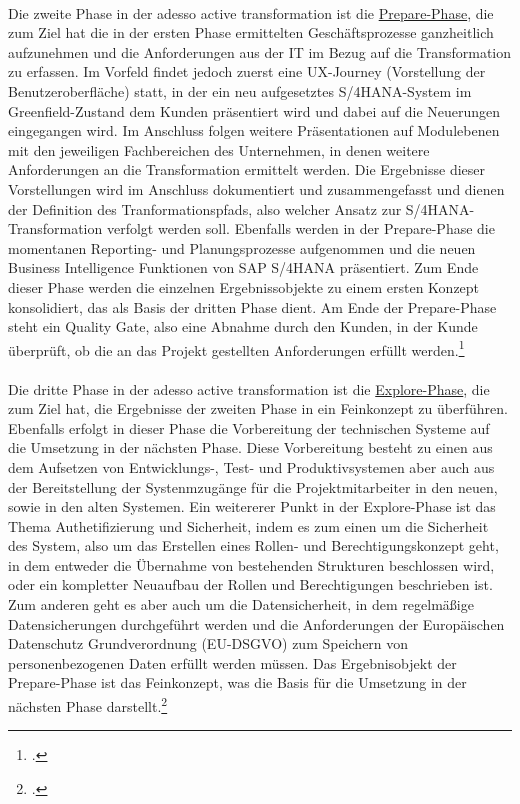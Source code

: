 \\Die zweite Phase in der adesso active transformation ist die \underline{\glqq{}Prepare\grqq{}-Phase}, die zum Ziel hat die in der ersten Phase ermittelten Geschäftsprozesse ganzheitlich aufzunehmen und die Anforderungen aus der IT im Bezug auf die Transformation zu erfassen. Im Vorfeld findet jedoch zuerst eine UX-Journey (Vorstellung der Benutzeroberfläche) statt, in der ein neu aufgesetztes S/4HANA-System im Greenfield-Zustand dem Kunden präsentiert wird und dabei auf die Neuerungen eingegangen wird. Im Anschluss folgen weitere Präsentationen auf Modulebenen mit den jeweiligen Fachbereichen des Unternehmen, in denen weitere Anforderungen an die Transformation ermittelt werden. Die Ergebnisse dieser Vorstellungen wird im Anschluss dokumentiert und zusammengefasst und dienen der Definition des Tranformationspfads, also welcher Ansatz zur S/4HANA-Transformation verfolgt werden soll. Ebenfalls werden in der Prepare-Phase die momentanen Reporting- und Planungsprozesse aufgenommen und die neuen Business Intelligence Funktionen von SAP S/4HANA präsentiert. Zum Ende dieser Phase werden die einzelnen Ergebnissobjekte zu einem ersten Konzept konsolidiert, das als Basis der dritten Phase dient. Am Ende der Prepare-Phase steht ein \glqq{}Quality Gate\grqq{}, also eine Abnahme durch den Kunden, in der Kunde überprüft, ob die an das Projekt gestellten Anforderungen erfüllt werden.\footcite[Vgl.][]{aat-prepare}\\
\vspace{1em}
\\Die dritte Phase in der adesso active transformation ist die \underline{\glqq{}Explore\grqq{}-Phase}, die zum Ziel hat, die Ergebnisse der zweiten Phase in ein Feinkonzept zu überführen. Ebenfalls erfolgt in dieser Phase die Vorbereitung der technischen Systeme auf die Umsetzung in der nächsten Phase. Diese Vorbereitung besteht zu einen aus dem Aufsetzen von Entwicklungs-, Test- und Produktivsystemen aber auch aus der Bereitstellung der Systenmzugänge für die Projektmitarbeiter in den neuen, sowie in den alten Systemen. Ein weitererer Punkt in der Explore-Phase ist das Thema Authetifizierung und Sicherheit, indem es zum einen um die Sicherheit des System, also um das Erstellen eines Rollen- und Berechtigungskonzept geht, in dem entweder die Übernahme von bestehenden Strukturen beschlossen wird, oder ein kompletter Neuaufbau der Rollen und Berechtigungen beschrieben ist. Zum anderen geht es aber auch um die Datensicherheit, in dem regelmäßige Datensicherungen durchgeführt werden und die Anforderungen der Europäischen Datenschutz Grundverordnung (EU-DSGVO) zum Speichern von personenbezogenen Daten erfüllt werden müssen. Das Ergebnisobjekt der Prepare-Phase ist das Feinkonzept, was die Basis für die Umsetzung in der nächsten Phase darstellt.\footcite[Vgl.][]{aat-explore}\\
